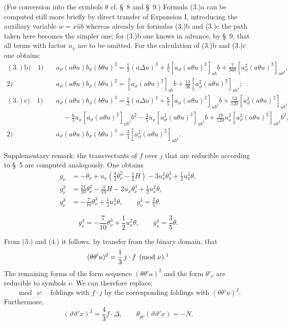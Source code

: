 \documentclass[11pt]{article}
\newcommand{\A}{\Delta}
\begin{document}
(For conversion into the symbols $\theta$ cf. \S\ 8 and \S\ 9.) Formula (3.)a can be computed still more briefly by direct transfer of Expansion I, introducing the auxiliary variable $w=x\widehat{u}b$ whereas already for formulas (3.)b and (3.)c the path taken here becomes the simpler one; for (3.)b one knows in advance, by \S\ 9, that all terms with factor $u_x$ are to be omitted. For the calculation of (3.)b and (3.)c one obtains:
\[
\begin{aligned}
(3.)\mathrm{b)}\quad 1)&\quad a_\vartheta(a\theta u)b_\vartheta(b\theta u)^2=\frac12(a\Delta u)^3+\frac45[a_\vartheta(a\theta u)^2]_{ub}b+\frac7{360}[a_\vartheta^2(a\theta u)^2]_{ub^2},\\
2)&\quad a_\vartheta(a\theta u)b_\vartheta(b\theta u)^2=[a_\vartheta(a\theta u)^2]_{ub}b+\frac{13}{36}[a_\vartheta^2(a\theta u)^2]_{ub^2};\\[.5em]
(3.)\mathrm{c)}\quad 1)&\quad a_\vartheta(a\theta u)b_\vartheta(b\theta u)^3=\frac12(a\Delta u)^4+\frac65[a_\vartheta(a\theta u)^2]_{ub^2}b+\frac{53}{120}[a_\vartheta^2(a\theta u)^2]_{ub^3}\\
&\qquad-\frac65u_x[a_\vartheta(a\theta u)^2]_{ub^3}b^2-\frac35u_x[a_\vartheta^2(a\theta u)^2]_{ub^2}b+\frac{19}{120}u_x^2[a_\vartheta^2(a\theta u)^2]_{ub^3}b^2,\\
2)&\quad a_\vartheta(a\theta u)b_\vartheta(b\theta u)^3=\frac34[a_\vartheta^2(a\theta u)^2]_{ub^2}.
\end{aligned}
\]

Supplementary remark: the transvectants of $f$ over $j$ that are reducible according to \S\ 5 are computed analogously. One obtains
\[
\tag{4}
\begin{aligned}
g_\nu&=-\theta_\nu+u_x\left(\frac92\theta_\nu^2-\frac12H\right)-3u_x^2\theta_\nu^3+\frac12u_x^3\theta,\\
g_\nu^2&=\frac{21}{10}\theta_\nu^2-\frac3{10}H-2u_x\theta_\nu^3+\frac12u_x^2\theta,\\
g_\nu^3&=-\frac7{10}\theta_\nu^3+\frac12u_x^2\theta,\qquad g_\nu^4=\frac35\theta.
\end{aligned}
\]




\[
\tag{4}
g_\nu^3=-\frac7{10}\theta_\nu^3+\frac12u_x^2\theta,
\qquad
g_\nu^4=\frac35\theta.
\]

From (3.) and (4.) it follows, by transfer from the binary domain, that
\[
(\theta\theta'u)^2=\frac13\,j\cdot f\pmod{\nu}.\footnotemark
\]
The remaining forms of the form sequence $(\theta\theta'u)^2$ and the form $\theta'_\nu$ are reducible to symbols $\nu$. We can therefore replace:
\[
\bmod\ \nu:\quad \text{foldings with } f\cdot j
\text{ by the corresponding foldings with }(\theta\theta'u)^2.
\]
Furthermore,
\[
(\vartheta\vartheta'x)^2=\frac43 f\cdot\A,
\qquad
\theta_{g\nu}(\vartheta\vartheta'x)=-N.
\]
\end{document}
